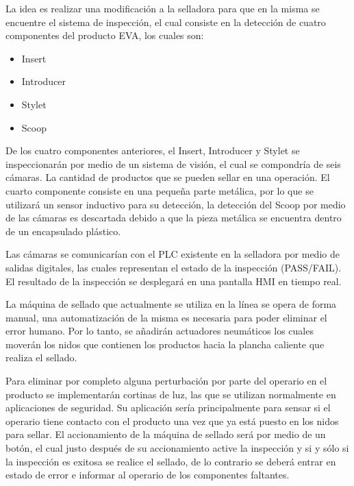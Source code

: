 La idea es realizar una modificaci\'on a la selladora para que en la misma se encuentre el sistema de inspecci\'on, el cual consiste en la detecci\'on de cuatro componentes del producto EVA, los cuales son:

\begin{itemize}

    \item Insert
    \item Introducer
    \item Stylet
    \item Scoop

\end{itemize}

De los cuatro componentes anteriores, el Insert, Introducer y Stylet se inspeccionar\'an por medio de un sistema de visi\'on, el cual se compondr\'ia de seis c\'amaras. La cantidad de productos que se pueden sellar en una operaci\'on. El cuarto componente consiste en una peque\~na parte met\'alica, por lo que se utilizar\'a un sensor inductivo para su detecci\'on, la detecci\'on del Scoop por medio de las c\'amaras es descartada debido a que la pieza met\'alica se encuentra dentro de un encapsulado pl\'astico. \par

Las c\'amaras se comunicar\'ian con el PLC existente en la selladora por medio de salidas digitales, las cuales representan el estado de la inspecci\'on (PASS/FAIL). El resultado de la inspecci\'on se desplegar\'a en una pantalla HMI en tiempo real. \par

La m\'aquina de sellado que actualmente se utiliza en la l\'inea se opera de forma manual, una automatizaci\'on de la misma es necesaria para poder eliminar el error humano. Por lo tanto, se a\~nadir\'an actuadores neum\'aticos los cuales mover\'an los nidos que contienen los productos hacia la plancha caliente que realiza el sellado. \par

Para eliminar por completo alguna perturbaci\'on por parte del operario en el producto se implementar\'an cortinas de luz, las que se utilizan normalmente en aplicaciones de seguridad. Su aplicaci\'on ser\'ia principalmente para sensar si el operario tiene contacto con el producto una vez que ya est\'a puesto en los nidos para sellar. El accionamiento de la m\'aquina de sellado ser\'a por medio de un bot\'on, el cual justo despu\'es de su accionamiento active la inspecci\'on y si y s\'olo si la inspecci\'on es exitosa se realice el sellado, de lo contrario se deber\'a entrar en estado de error e informar al operario de los componentes faltantes.

